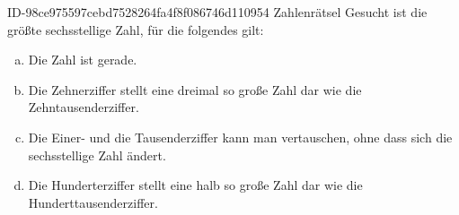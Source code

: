 \begin{exercise}
      {ID-98ce975597cebd7528264fa4f8f086746d110954}
      {Zahlenrätsel}
  \ifproblem\problem
    Gesucht ist die größte sechsstellige Zahl, für die folgendes gilt:
    \begin{enumerate}[a)]
      \squeeze
      \item Die Zahl ist gerade.
      \item Die Zehnerziffer stellt eine dreimal so große Zahl dar wie
            die Zehntausenderziffer.
      \item Die Einer- und die Tausenderziffer kann man vertauschen,
            ohne dass sich die sechsstellige Zahl ändert.
      \item Die Hunderterziffer stellt eine halb so große Zahl dar wie
            die Hunderttausenderziffer.
    \end{enumerate}
  \fi
\end{exercise}
  
%

